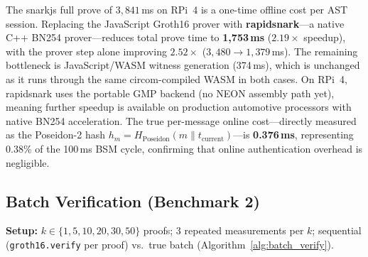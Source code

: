 \begin{table}[t]
\centering
\caption{BN254 Pairing Cost Breakdown on RPi~4 (20 runs, mean $\pm$ std)}
\label{tab:pairing_breakdown}
\end{table}

The snarkjs full prove of $3{,}841$\,ms on RPi~4 is a one-time offline cost per AST
session. Replacing the JavaScript Groth16 prover with \textbf{rapidsnark}---a native
C++ BN254 prover---reduces total prove time to \textbf{1{,}753\,ms} ($2.19\times$
speedup), with the prover step alone improving $2.52\times$ ($3{,}480 \to 1{,}379$\,ms).
The remaining bottleneck is JavaScript/WASM witness generation (374\,ms), which is
unchanged as it runs through the same circom-compiled WASM in both cases. On RPi~4,
rapidsnark uses the portable GMP backend (no NEON assembly path yet), meaning further
speedup is available on production automotive processors with native BN254
acceleration. The true per-message online cost---directly measured as the Poseidon-2
hash $h_m = H_{\text{Poseidon}}(m \| t_{\text{current}})$---is \textbf{0.376\,ms},
representing $0.38$\% of the 100\,ms BSM cycle, confirming that online
authentication overhead is negligible.

\subsection{Batch Verification (Benchmark 2)}

\textbf{Setup:} $k \in \{1,5,10,20,30,50\}$ proofs; 3 repeated measurements per
$k$; sequential (\texttt{groth16.verify} per proof) vs.\ true batch
(Algorithm~\ref{alg:batch_verify}).

